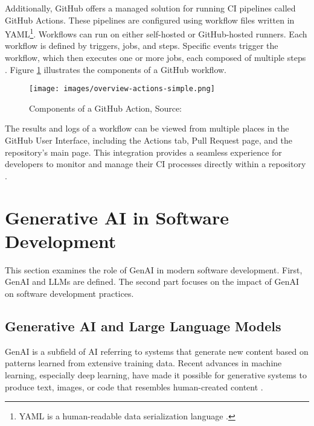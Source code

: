 Additionally, GitHub offers a managed solution for running CI pipelines called GitHub Actions. These pipelines are configured using workflow files written in YAML\footnote{YAML is a human-readable data serialization language \cite{OfficialYAMLWeb}.}. Workflows can run on either self-hosted or GitHub-hosted runners. Each workflow is defined by triggers, jobs, and steps. Specific events trigger the workflow, which then executes one or more jobs, each composed of multiple steps \cite{UnderstandingGitHubActionsa}. Figure \ref{fig:gh-workflow} illustrates the components of a GitHub workflow.

\begin{figure}[H]
    \centering
    \texttt{[image: images/overview-actions-simple.png]}
    \caption{Components of a GitHub Action, Source:~\cite{UnderstandingGitHubActionsa}}
    \label{fig:gh-workflow}
\end{figure}

The results and logs of a workflow can be viewed from multiple places in the GitHub User Interface, including the Actions tab, Pull Request page, and the repository's main page. This integration provides a seamless experience for developers to monitor and manage their CI processes directly within a repository \cite{GitHubActions2025}.


\section{Generative AI in Software Development}

This section examines the role of \ac{GenAI} in modern software development. First, \ac{GenAI} and \acp{LLM} are defined. The second part focuses on the impact of \ac{GenAI} on software development practices.

\subsection{Generative AI and Large Language Models}
\ac{GenAI} is a subfield of \ac{AI} referring to systems that generate new content based on patterns learned from extensive training data. Recent advances in machine learning, especially deep learning, have made it possible for generative systems to produce text, images, or code that resembles human-created content \cite{WhatGenerativeAI2021}.

